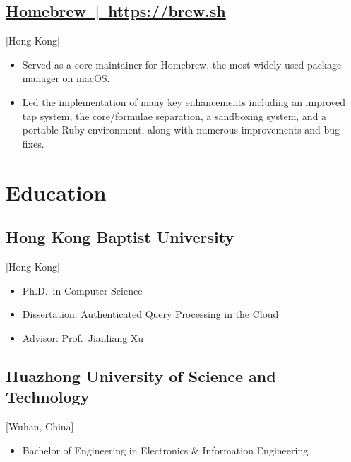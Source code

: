 \documentclass{mycv}
\begin{document}
\subsection{\href{https://brew.sh}{Homebrew~|~https://brew.sh}}[Hong Kong]
\begin{positions}
\end{positions}

\begin{itemize}
  \item Served as a core maintainer for Homebrew, the most widely-used package manager on macOS\@.
  \item Led the implementation of many key enhancements including an improved tap system, the core/formulae separation, a sandboxing system, and a portable Ruby environment, along with numerous improvements and bug fixes.
\end{itemize}

\section{Education}

\subsection{Hong Kong Baptist University}[Hong Kong]
\vspace{-\parskip}%
\begin{itemize}[label={}]
  \item Ph.D.\ in Computer Science 
  \item Dissertation: \href{https://scholars.hkbu.edu.hk/en/studentTheses/authenticated-query-processing-in-the-cloud}{Authenticated Query Processing in the Cloud}
  \item Advisor: \href{https://www.comp.hkbu.edu.hk/~xujl}{Prof.~Jianliang Xu}
\end{itemize}

\subsection{Huazhong University of Science and Technology}[Wuhan, China]
\vspace{-\parskip}%
\begin{itemize}[label={}]
  \item Bachelor of Engineering in Electronics \& Information Engineering 
\end{itemize}
\end{document}
